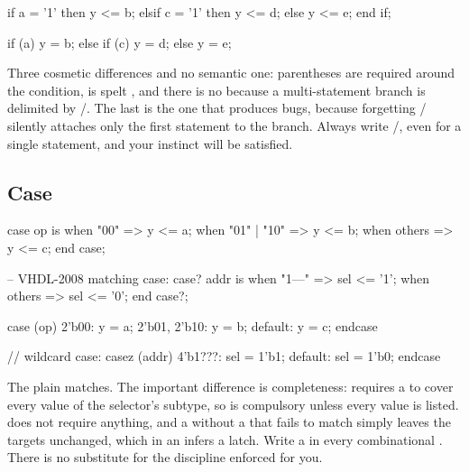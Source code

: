 \begin{rosetta}
\begin{rleft}
if a = '1' then
  y <= b;
elsif c = '1' then
  y <= d;
else
  y <= e;
end if;
\end{rleft}
\begin{rright}
if (a)
  y = b;
else if (c)
  y = d;
else
  y = e;
\end{rright}
\end{rosetta}

Three cosmetic differences and no semantic one: parentheses are required around
the condition,  is spelt , and there is no
 because a multi-statement branch is delimited by
/. The last is the one that produces bugs, because
forgetting / silently attaches only the first statement
to the branch. Always write /, even for a single
statement, and your \VHDL{} instinct will be satisfied.

\subsection{Case}

\begin{rosetta}
\begin{rleft}
case op is
  when "00" =>
    y <= a;
  when "01" | "10" =>
    y <= b;
  when others =>
    y <= c;
end case;

-- VHDL-2008 matching case:
case? addr is
  when "1---" => sel <= '1';
  when others => sel <= '0';
end case?;
\end{rleft}
\begin{rright}
case (op)
  2'b00:
    y = a;
  2'b01, 2'b10:
    y = b;
  default:
    y = c;
endcase

// wildcard case:
casez (addr)
  4'b1???: sel = 1'b1;
  default: sel = 1'b0;
endcase
\end{rright}
\end{rosetta}


The plain  matches. The important difference is completeness:
\VHDL{} requires a  to cover every value of the selector's subtype,
so  is compulsory unless every value is listed. \SV{} does
not require anything, and a  without a  that fails to
match simply leaves the targets unchanged, which in an 
infers a latch. Write a  in every combinational . There
is no substitute for the discipline \VHDL{} enforced for you.

